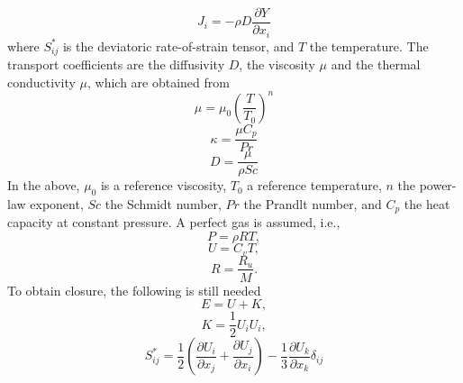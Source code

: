 \documentclass[oneside,a4paper,11pt]{report}
\begin{document}
\begin{equation}
    \label{eq:diffusive_scalar_flux}
    J_i = -\rho D \frac{\partial Y}{\partial x_i} 
\end{equation}
where $S_{ij}^*$ is the deviatoric rate-of-strain tensor, and $T$ the temperature. The transport coefficients are the diffusivity $D$, the viscosity $\mu$ and the thermal conductivity $\mu$, which are obtained from
\begin{equation}
    \mu = \mu_0 \left ( \frac{T}{T_0} \right )^n
\end{equation}
\begin{equation}
    \kappa = \frac{\mu C_p}{Pr}
\end{equation}
\begin{equation}
    D = \frac{\mu}{\rho Sc}
\end{equation}
In the above, $\mu_0$ is a reference viscosity, $T_0$ a reference temperature, $n$ the power-law exponent, $Sc$ the Schmidt number, $Pr$ the Prandlt number, and $C_p$ the heat capacity at constant pressure. A perfect gas is assumed, i.e.,
\begin{equation}
    P = \rho R T,
\end{equation}
\begin{equation} 
    U = C_v T ,
\end{equation}
\begin{equation}
R = \frac{R_u}{M}.
\end{equation}
To obtain closure, the following is still needed
\begin{equation}
     E = U + K ,
\end{equation}
\begin{equation}
K = \frac{1}{2} U_i U_i ,
\end{equation}
\begin{equation}
    S^*_{ij} = \frac{1}{2} \left ( \frac{\partial U_i}{\partial x_j} + \frac{\partial U_j}{\partial x_i} \right ) - \frac{1}{3} \frac{\partial U_k}{\partial x_k} \delta_{ij} 
\end{equation}
\end{document}
